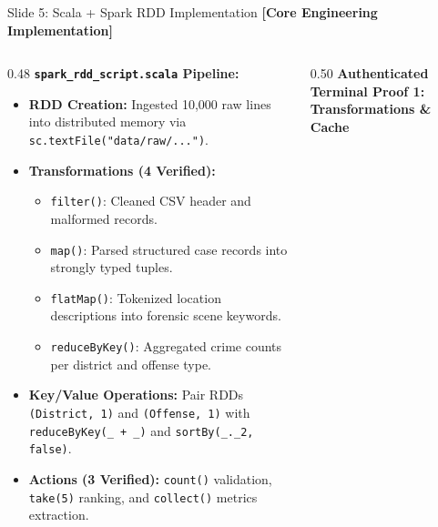 \documentclass[aspectratio=169]{beamer}
\begin{document}
\begin{frame}[fragile]{Slide 5: Scala + Spark RDD Implementation \hfill \footnotesize\color{AmritaMaroon}\textbf{[Core Engineering Implementation]}}
    \begin{columns}[T]
        \begin{column}{0.48\textwidth}
            \textbf{\textcolor{NavyBlue}{\texttt{spark\_rdd\_script.scala} Pipeline:}}
            \begin{itemize}\tiny
                \setlength{\itemsep}{2pt}
                \item \textbf{RDD Creation:} Ingested 10,000 raw lines into distributed memory via \texttt{sc.textFile("data/raw/...")}.
                \item \textbf{Transformations (4 Verified):}
                  \begin{itemize}\tiny
                    \item \texttt{filter()}: Cleaned CSV header and malformed records.
                    \item \texttt{map()}: Parsed structured case records into strongly typed tuples.
                    \item \texttt{flatMap()}: Tokenized location descriptions into forensic scene keywords.
                    \item \texttt{reduceByKey()}: Aggregated crime counts per district and offense type.
                  \end{itemize}
                \item \textbf{Key/Value Operations:} Pair RDDs \texttt{(District, 1)} and \texttt{(Offense, 1)} with \texttt{reduceByKey(\_ + \_)} and \texttt{sortBy(\_.\_2, false)}.
                \item \textbf{Actions (3 Verified):} \texttt{count()} validation, \texttt{take(5)} ranking, and \texttt{collect()} metrics extraction.
            \end{itemize}
        \end{column}
        \begin{column}{0.50\textwidth}
            \centering
            {\scriptsize\textbf{\textcolor{NavyBlue}{Authenticated Terminal Proof 1: Transformations \& Cache}}}\par

\end{column}
\end{columns}
\end{frame}
\end{document}

